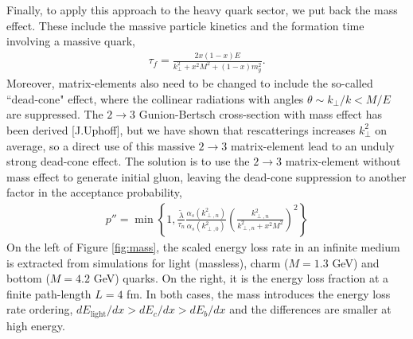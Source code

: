\documentclass[aps, prc, reprint, amsmath, groupedaddress, nofootinbib]{revtex4-1}
\begin{document}
Finally, to apply this approach to the heavy quark sector, we put back the mass effect. 
These include the massive particle kinetics and the formation time involving a massive quark,
\begin{eqnarray}
\tau_{f} = \frac{2x(1-x)E}{k_\perp^2 + x^2M^2 + (1-x)m_g^2}.
\end{eqnarray}
Moreover, matrix-elements also need to be changed to include the so-called ``dead-cone" effect, where the collinear radiations with angles $\theta \sim k_\perp/k < M/E$ are suppressed. 
The $2\rightarrow3$ Gunion-Bertsch cross-section with mass effect has been derived [J.Uphoff], but we have shown that rescatterings increases $k_{\perp}^2$ on average, so a direct use of this massive $2\rightarrow3$ matrix-element lead to an unduly strong dead-cone effect.
The solution is to use the $2\rightarrow3$ matrix-element without mass effect to generate initial gluon, leaving the dead-cone suppression to another factor in the acceptance probability,
\begin{eqnarray}
p'' = \min\left\{1, \frac{\tilde{\lambda}}{\tau_n}\frac{\alpha_s(k_{\perp,n}^2)}{\alpha_s(k_{\perp,0}^2)} \left(\frac{k_{\perp,n}^2}{k_{\perp,n}^2+x^2 M^2}\right)^2\right\}
\end{eqnarray}
On the left of Figure \ref{fig:mass}, the scaled energy loss rate in an infinite medium is extracted from simulations for light (massless), charm ($M=1.3$ GeV) and bottom ($M=4.2$ GeV) quarks. 
On the right, it is the energy loss fraction at a finite path-length $L=4$ fm.
In both cases, the mass introduces the energy loss rate ordering, $dE_{\textrm{light}}/dx > dE_c/dx > dE_b/dx$ and the differences are smaller at high energy.
\end{document}
